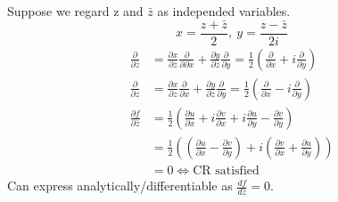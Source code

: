 \documentclass[a4paper, 11pt, normalem]{report}
\newcommand\p{\partial}
\begin{document}
Suppose we regard z and $\bar{z}$ as independed variables. 
\begin{equation}
    x = \frac{z + \bar{z}}{2},~ y = \frac{z - \bar{z}}{2i} 
\end{equation}
\begin{align}
    \frac{\p}{\p \bar{z}} &= \frac{\p x}{\p \bar{z}}\frac{\p}{\p \p x} + \frac{\p y}{\p \bar{z}}\frac{\p}{\p y} = \frac{1}{2}\left(\frac{\p}{\p x} + i\frac{\p}{\p y}\right) \\
    \frac{\p}{\p z} &= \frac{\p x}{\p z}\frac{\p}{\p x} + \frac{\p y}{\p z}\frac{\p}{\p y} = \frac{1}{2}\left(\frac{\p}{\p x} - i\frac{\p}{\p y}\right) \\
    \frac{\p f}{\p \bar{z}} &= \frac{1}{2}\left(\frac{\p u}{\p x} + i\frac{\p v}{\p x} + i\frac{\p u}{\p y} - \frac{\p v}{\p y}\right) \\
                    &= \frac{1}{2}\left(\left(\frac{\p u}{\p x} - \frac{\p v}{\p y}\right) + i\left(\frac{\p v}{\p x} + \frac{\p u}{\p y}\right) \right) \\
                    &= 0 \iff \text{CR satisfied}
\end{align}
Can express analytically/differentiable as $\frac{df}{d\bar{z}} = 0$.
\end{document}
